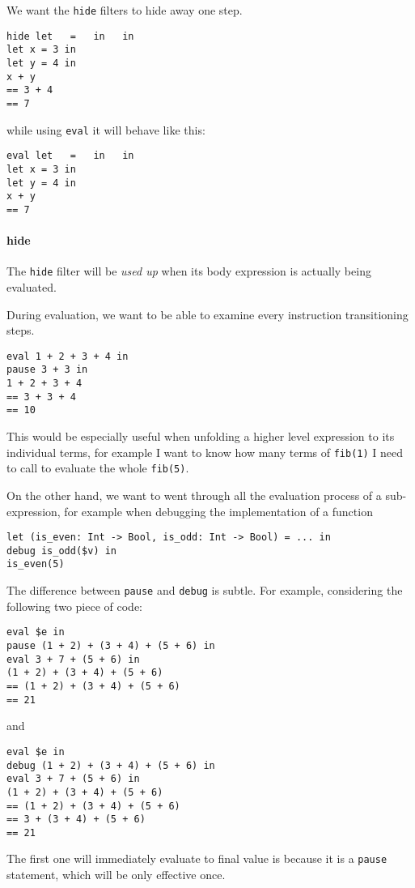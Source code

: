 We want the \verb|hide| filters to hide away one step.
\begin{verbatim}
hide let   =   in   in
let x = 3 in
let y = 4 in
x + y
== 3 + 4
== 7
\end{verbatim}
while using \verb|eval| it will behave like this:
\begin{verbatim}
eval let   =   in   in
let x = 3 in
let y = 4 in
x + y
== 7
\end{verbatim}

\paragraph{hide} The \verb|hide| filter will be \emph{used up} when its body
expression is actually being evaluated.

During evaluation, we want to be able to examine every instruction
transitioning steps.

\begin{verbatim}
eval 1 + 2 + 3 + 4 in
pause 3 + 3 in
1 + 2 + 3 + 4
== 3 + 3 + 4
== 10
\end{verbatim}

This would be especially useful when unfolding a higher level
expression to its individual terms, for example I want to know how
many terms of \verb|fib(1)| I need to call to evaluate the whole
\verb|fib(5)|.

On the other hand, we want to went through all the evaluation process of a
sub-expression, for example when debugging the implementation of a function
\begin{verbatim}
let (is_even: Int -> Bool, is_odd: Int -> Bool) = ... in
debug is_odd($v) in
is_even(5)
\end{verbatim}

The difference between \verb|pause| and \verb|debug| is subtle. For
example, considering the following two piece of code:
\begin{verbatim}
eval $e in
pause (1 + 2) + (3 + 4) + (5 + 6) in
eval 3 + 7 + (5 + 6) in
(1 + 2) + (3 + 4) + (5 + 6)
== (1 + 2) + (3 + 4) + (5 + 6)
== 21
\end{verbatim}
and
\begin{verbatim}
eval $e in
debug (1 + 2) + (3 + 4) + (5 + 6) in
eval 3 + 7 + (5 + 6) in
(1 + 2) + (3 + 4) + (5 + 6)
== (1 + 2) + (3 + 4) + (5 + 6)
== 3 + (3 + 4) + (5 + 6)
== 21
\end{verbatim}
The first one will immediately evaluate to final value is because it is a \verb|pause| statement, which will be only effective once.


